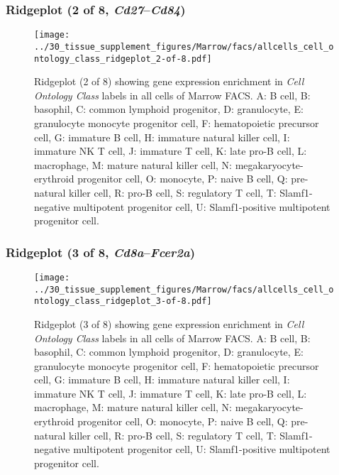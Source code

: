 \clearpage

\subsubsection{Ridgeplot (2 of 8, \emph{Cd27}--\emph{Cd84})}
\begin{figure}[h]
\centering
\texttt{[image: ../30\_tissue\_supplement\_figures/Marrow/facs/allcells\_cell\_ontology\_class\_ridgeplot\_2-of-8.pdf]}

\caption{ Ridgeplot (2 of 8)  showing gene expression enrichment in \emph{Cell Ontology Class} labels in all cells of Marrow FACS. A: B cell, B: basophil, C: common lymphoid progenitor, D: granulocyte, E: granulocyte monocyte progenitor cell, F: hematopoietic precursor cell, G: immature B cell, H: immature natural killer cell, I: immature NK T cell, J: immature T cell, K: late pro-B cell, L: macrophage, M: mature natural killer cell, N: megakaryocyte-erythroid progenitor cell, O: monocyte, P: naive B cell, Q: pre-natural killer cell, R: pro-B cell, S: regulatory T cell, T: Slamf1-negative multipotent progenitor cell, U: Slamf1-positive multipotent progenitor cell.}
\end{figure}


\clearpage

\subsubsection{Ridgeplot (3 of 8, \emph{Cd8a}--\emph{Fcer2a})}
\begin{figure}[h]
\centering
\texttt{[image: ../30\_tissue\_supplement\_figures/Marrow/facs/allcells\_cell\_ontology\_class\_ridgeplot\_3-of-8.pdf]}

\caption{ Ridgeplot (3 of 8)  showing gene expression enrichment in \emph{Cell Ontology Class} labels in all cells of Marrow FACS. A: B cell, B: basophil, C: common lymphoid progenitor, D: granulocyte, E: granulocyte monocyte progenitor cell, F: hematopoietic precursor cell, G: immature B cell, H: immature natural killer cell, I: immature NK T cell, J: immature T cell, K: late pro-B cell, L: macrophage, M: mature natural killer cell, N: megakaryocyte-erythroid progenitor cell, O: monocyte, P: naive B cell, Q: pre-natural killer cell, R: pro-B cell, S: regulatory T cell, T: Slamf1-negative multipotent progenitor cell, U: Slamf1-positive multipotent progenitor cell.}
\end{figure}


\clearpage

